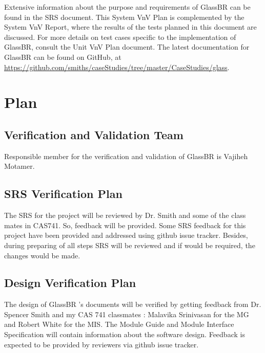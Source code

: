 \documentclass[12pt, titlepage]{article}
\newcommand{\progname}{GlassBR}
\begin{document}
\noindent Extensive information about the purpose and requirements of
\progname{} can be found in the SRS document. This System VnV Plan is
complemented by the System VnV Report, where the results of the tests planned in
this document are discussed. For more details on test cases specific to the
implementation of \progname{}, consult the Unit VnV Plan document. The latest
documentation for \progname{} can be found on GitHub, at \newline
\href{https://github.com/smiths/caseStudies/tree/master/CaseStudies/glass}
{https://github.com/smiths/caseStudies/tree/master/CaseStudies/glass}. 

\section{Plan} \label{sec_Plan}
	
\subsection{Verification and Validation Team}

\noindent Responsible member for the verification and validation 
of \progname{} is Vajiheh Motamer.

\subsection{SRS Verification Plan}

\noindent The SRS for the project will be reviewed by Dr. Smith and some of the class mates in CAS741.
So, feedback will be provided. Some SRS feedback for this project have been
provided and addressed using github issue tracker. Besides, during preparing of all steps SRS will be reviewed and if would be required, the changes would be made.

\subsection{Design Verification Plan}

\noindent The design of \progname{} 's  documents will be verified by getting feedback from Dr.
Spencer Smith and my CAS 741 classmates : Malavika Srinivasan
 for the MG and Robert White
 for the MIS. The Module Guide and Module Interface Specification will
contain information about the software design. Feedback is expected to be
provided by reviewers via github issue tracker. 
\end{document}

